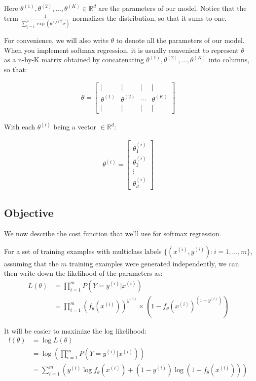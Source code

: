 Here $\theta^{(1)}, \theta^{(2)}, \ldots, \theta^{(K)} \in \mathbb{R}^{d}$ are the parameters of our model. Notice that the term $\frac{1}{ \sum_{j=1}^{K}{\exp(\theta^{(j)\top} x) } }$ normalizes the distribution, so that it sums to one.

For convenience, we will also write $\theta$ to denote all the parameters of our model. When you implement softmax regression, it is usually convenient to represent $\theta$ as a n-by-K matrix obtained by concatenating $\theta^{(1)}, \theta^{(2)}, \ldots, \theta^{(K)}$ into columns, so that:

\begin{align}
	\theta = \left[\begin{array}{cccc}| & | & | & | \\ \theta^{(1)} & \theta^{(2)} & \cdots & \theta^{(K)} \\ | & | & | & | \end{array}\right]
\end{align}

With each $\theta^{(i)}$ being a vector $\in \mathbb{R}^{d}$:

\begin{align}
	\theta^{(i)} = \left[
		\begin{array}{cccc}
			\theta_{1}^{(i)} \\
			\theta_{2}^{(i)} \\
			\vdots \\
			\theta_{d}^{(i)}
		\end{array}\right]
\end{align}


\subsection{Objective}

We now describe the cost function that we’ll use for softmax regression.

For a set of training examples with multiclass labels $\{ (x^{(i)}, y^{(i)}) : i=1,\ldots,m\}$, assuming that the $m$ training examples were generated independently, we can then write down the likelihood of the parameters as:
\begin{align}
	L(\theta) &= \prod_{i=1}^m P(Y=y^{(i)} | x^{(i)} ) \\
			  &= \prod_{i=1}^m (f_\theta(x^{(i)}))^{y^{(i)}} \times (1 - f_\theta(x^{(i)})^{(1-y^{(i)})})
\end{align}

It will be easier to maximize the log likelihood:
\begin{align}
	l(\theta) &= \log L(\theta) \\
			  &= \log \left( \prod_{i=1}^m P(Y=y^{(i)} | x^{(i)}) \right) \\
			  &= \sum_{i=1}^m \left( y^{(i)}\log f_\theta(x^{(i)}) + (1-y^{(i)})\log (1 - f_\theta(x^{(i)})) \right)
\end{align}

